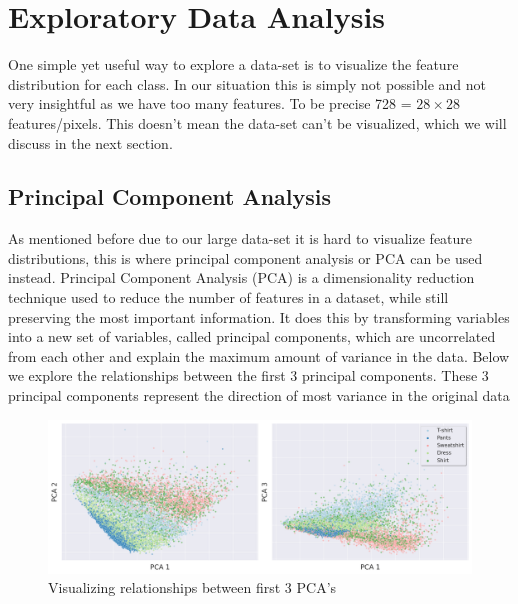 \section{Exploratory Data Analysis}

One simple yet useful way to explore a data-set is to visualize the feature distribution for each class.
In our situation this is simply not possible and not very insightful as we have too many features.
To be precise 728 = $28\times28$ features/pixels.
This doesn't mean the data-set can't be visualized, which we will discuss in the next section.

\subsection{Principal Component Analysis}\label{subsec:principal-component-analysis}
As mentioned before due to our large data-set it is hard to visualize feature distributions, this is where principal component analysis or PCA can be used instead.
Principal Component Analysis (PCA) is a dimensionality reduction technique used to reduce the number of features in a dataset, while still preserving the most important information.
It does this by transforming variables into a new set of variables, called principal components, which are uncorrelated from each other and explain the maximum amount of variance in the data.
Below we explore the relationships between the first 3 principal components.
These 3 principal components represent the direction of most variance in the original data\\
\begin{figure}[ht]
    \centering
    \includegraphics[scale=0.32]{figures_for_report/PCA}
    \captionsetup{justification=centering,margin=2cm}
    \caption{Visualizing relationships between first 3 PCA's}\label{fig:figure}
\end{figure}

